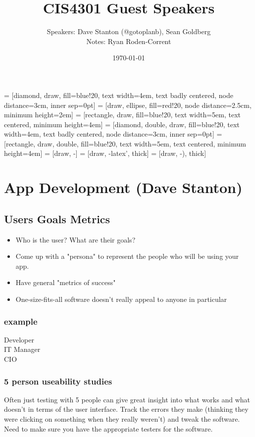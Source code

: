 \documentclass[12pt]{article}
\title{CIS4301 Guest Speakers}
\author{
  Speakers: Dave Stanton (@gotoplanb), Sean Goldberg \\
  Notes: Ryan Roden-Corrent
}
\date{\today}
\begin{document}
\setlength\parindent{0pt}
 = [diamond, draw, fill=blue!20, text width=4em,
  text badly centered, node distance=3cm, inner sep=0pt]
 = [draw, ellipse, fill=red!20, node distance=2.5cm,
  minimum height=2em]
 = [rectangle, draw, fill=blue!20, text width=5em,
  text centered, minimum height=4em]
 = [diamond, double, draw, fill=blue!20, text width=4em,
  text badly centered, node distance=3cm, inner sep=0pt]
 = [rectangle, draw, double, fill=blue!20, text width=5em,
  text centered, minimum height=4em]
 = [draw, -]
 = [draw, -latex', thick]
 = [draw, -), thick]
\maketitle

\section{App Development (Dave Stanton)}
\subsection{Users Goals Metrics}
\begin{itemize}
  \item Who is the user? What are their goals?
  \item Come up with a "persona" to represent the people who will
    be using your app.
  \item Have general "metrics of success"
  \item One-size-fits-all software doesn't really appeal to anyone in particular
\end{itemize}

\subsubsection{example}
\begin{description}
  \item[Developer]
  \item[IT Manager]
  \item[CIO]
\end{description}

\subsubsection{5 person useability studies}
Often just testing with 5 people can give great insight into what works and
what doesn't in terms of the user interface. Track the errors they make
(thinking they were clicking on something when they really weren't) and tweak
the software. Need to make sure you have the appropriate testers for the
software.
\end{document}
